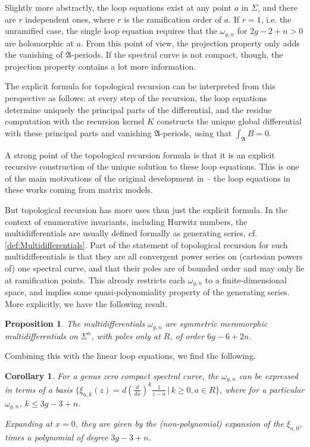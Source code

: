 \documentclass[10pt,a4paper,oneside,no-math,reqno]{amsart}%
\theoremstyle{plain}
\newtheorem{proposition}[theorem]{Proposition}
\newtheorem{corollary}[theorem]{Corollary}
\theoremstyle{definition}
\theoremstyle{remark}
\numberwithin{equation}{section}
\newcommand{\mf}[1]{\mathfrak{#1}}
\newcommand{\1}{\mathds{1}}
\newcommand{\<}{\langle}
\renewcommand{\>}{\rangle}
\begin{document}
Slightly more abstractly, the loop equations exist at any point $ a$ in $ \Sigma$, and there are $ r$ independent ones, where $r$ is the ramification order of $ a$. If $ r = 1$, i.e. the unramified case, the single loop equation requires that the $ \omega_{g,n}$ for $ 2g-2+n > 0$ are holomorphic at $ a$. From this point of view, the projection property only adds the vanishing of $ \mf{A}$-periods. If the spectral curve is not compact, though, the projection property contains a lot more information.

The explicit formula for topological recursion can be interpreted from this perspective as follows: at every step of the recursion, the loop equations determine uniquely the principal parts of the differential, and the residue computation with the recursion kernel $K$ constructs the unique global differential with these principal parts and vanishing $ \mf{A}$-periods, using that $ \int_\mf{A} B = 0$.

A  strong point of the topological recursion formula is that it is an explicit recursive construction of the unique solution to these loop equations. This is one of the main motivations of the original development in  \cite{CEO06,EO07} -- the loop equations in these works coming from matrix models.

But topological recursion has more uses than just the explicit formula. In the context of enumerative invariants, including Hurwitz numbers, the multidifferentials are usually defined formally as generating series, cf. \cref{def:Multidifferentials}. Part of the statement of topological recursion for such multidifferentials is that they are all convergent power series on (cartesian powers of) one spectral curve, and that their poles are of bounded order and may only lie at ramification points. This already restricts each $ \omega_{g,n}$ to a finite-dimensional space, and implies some quasi-polynomiality property of the generating series. More explicitly, we have the following result.

\begin{proposition}
    The multidifferentials $ \omega_{g,n}$ are symmetric meromorphic multidifferentials on $ \Sigma^n$, with poles only at $R$, of order $ 6g-6+2n$.
\end{proposition}

Combining this with the linear loop equations, we find the following.

\begin{corollary}
    For a genus zero compact spectral curve, the $ \omega_{g,n}$ can be expressed in terms of a  basis $ \{ \xi_{a,k} (z) = d (\frac{d}{dx})^k \frac{1}{z -a} \, | \, k \geq 0, a \in R\} $, where for a particular $ \omega_{g,n}$, $ k \leq 3g-3+n$.\par
    Expanding at $ x= 0$, they are given by the (non-polynomial) expansion of the $ \xi_{a,0}$, times a polynomial of degree $ 3g-3+n$.
\end{corollary}
\end{document}
